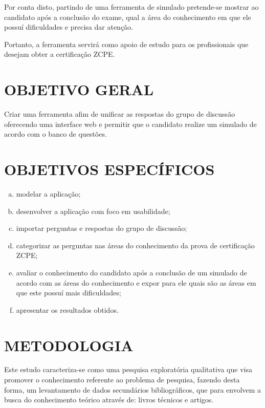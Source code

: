 Por conta disto, partindo de uma ferramenta de simulado pretende-se mostrar ao
candidato após a conclusão do exame, qual a área do conhecimento em que ele 
possuí dificuldades e precisa dar atenção.

Portanto, a ferramenta servirá como apoio de
estudo para os profissionais que desejam obter a certificação \acs{ZCPE}.

\section{OBJETIVO GERAL}

Criar uma ferramenta afim de unificar as respostas do grupo de discussão
oferecendo uma interface web e permitir que o candidato realize um simulado 
de acordo com o banco de questões.

\section{OBJETIVOS ESPECÍFICOS}

\begin{enumerate}[a)]
    \item modelar a aplicação;
    \item desenvolver a aplicação com foco em usabilidade;
    \item importar perguntas e respostas do grupo de discussão;
    \item categorizar as perguntas nas áreas do conhecimento da prova de
    certificação \acs{ZCPE};
    \item avaliar o conhecimento do candidato após a conclusão de um simulado 
    de acordo com as áreas do conhecimento e expor para ele quais são as áreas  em
    que este possuí mais dificuldades;
    \item apresentar os resultados obtidos.
\end{enumerate}

\section{METODOLOGIA}

Este estudo caracteriza-se como uma pesquisa exploratória qualitativa que visa
promover o conhecimento referente ao problema de pesquisa, fazendo desta forma,
um levantamento de dados secundários bibliográficos, que para
 envolvem a busca do conhecimento 
teórico através de: livros técnicos e artigos.

